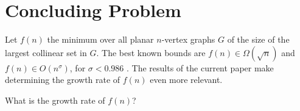 \documentclass{patmorin}
\begin{document}
\section{Concluding Problem}

Let $f(n)$ the minimum over all planar $n$-vertex graphs $G$ of the
size of the largest collinear set in $G$.  The best known bounds are
$f(n)\in\Omega(\sqrt{n})$ and $f(n)\in O(n^\sigma)$, for $\sigma
< 0.986$ \cite{bose.dujmovic.ea:polynomial,ravsky.verbitsky:on}.
The results of the current paper make determining the growth rate of
$f(n)$ even more relevant.

\begin{op}
   What is the growth rate of $f(n)$?
\end{op}




\end{document}

